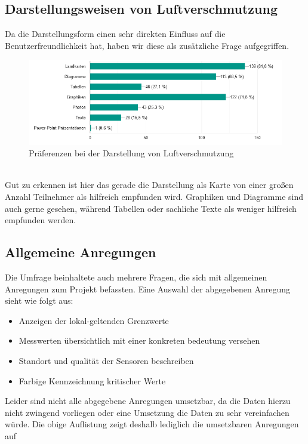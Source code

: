 \subsection{Darstellungsweisen von Luftverschmutzung}
Da die Darstellungsform einen sehr direkten Einfluss auf die Benutzerfreundlichkeit hat, haben wir diese als zusätzliche Frage aufgegriffen.
\\
\begin{figure}[h]
    \centering
    \includegraphics[width=1\textwidth]{media/diagram/darstellung.png}
    \caption{Präferenzen bei der Darstellung von Luftverschmutzung}
\end{figure}
\\
Gut zu erkennen ist hier das gerade die Darstellung als Karte von einer großen Anzahl Teilnehmer als hilfreich empfunden wird.
Graphiken und Diagramme sind auch gerne gesehen, während Tabellen oder sachliche Texte als weniger hilfreich empfunden werden.

\subsection{Allgemeine Anregungen}
Die Umfrage beinhaltete auch mehrere Fragen, die sich mit allgemeinen Anregungen zum Projekt befassten. Eine Auswahl der abgegebenen Anregung sieht wie folgt aus:
\begin{itemize} [noitemsep]
    \item Anzeigen der lokal-geltenden Grenzwerte
    \item Messwerten übersichtlich mit einer konkreten bedeutung versehen
    \item Standort und qualität der Sensoren beschreiben
    \item Farbige Kennzeichnung kritischer Werte
\end{itemize}
Leider sind nicht alle abgegebene Anregungen umsetzbar, da die Daten hierzu nicht zwingend vorliegen oder eine Umsetzung die Daten zu sehr vereinfachen würde. Die obige Auflistung zeigt deshalb lediglich die umsetzbaren Anregungen auf